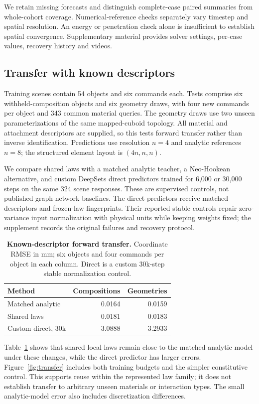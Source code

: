 \documentclass[10pt,twocolumn,letterpaper]{article}
\begin{document}
We retain missing forecasts and distinguish complete-case paired summaries from whole-cohort coverage. Numerical-reference checks separately vary timestep and spatial resolution. An energy or penetration check alone is insufficient to establish spatial convergence. Supplementary material provides solver settings, per-case values, recovery history and videos.

\subsection{Transfer with known descriptors}
Training scenes contain 54 objects and six commands each. Tests comprise six withheld-composition objects and six geometry draws, with four new commands per object and 343 common material queries. The geometry draws use two unseen parameterizations of the same mapped-cuboid topology. All material and attachment descriptors are supplied, so this tests forward transfer rather than inverse identification. Predictions use resolution $n=4$ and analytic references $n=8$; the structured element layout is $(4n,n,n)$.

We compare shared laws with a matched analytic teacher, a Neo-Hookean alternative, and custom DeepSets direct predictors trained for 6,000 or 30,000 steps on the same 324 scene responses. These are supervised controls, not published graph-network baselines. The direct predictors receive matched descriptors and frozen-law fingerprints. Their reported stable controls repair zero-variance input normalization with physical units while keeping weights fixed; the supplement records the original failures and recovery protocol.

\begin{table}[t]
\centering\small
\caption{\textbf{Known-descriptor forward transfer.} Coordinate RMSE in mm; six objects and four commands per object in each column. Direct is a custom 30k-step stable normalization control.}
\label{tab:transfer}
\begin{tabular}{lrr}\toprule
Method & Compositions & Geometries\\\midrule
Matched analytic & 0.0164 & 0.0159\\
Shared laws & 0.0181 & 0.0183\\
Custom direct, 30k & 3.0888 & 3.2933\\\bottomrule
\end{tabular}
\end{table}

Table~\ref{tab:transfer} shows that shared local laws remain close to the matched analytic model under these changes, while the direct predictor has larger errors. Figure~\ref{fig:transfer} includes both training budgets and the simpler constitutive control. This supports reuse within the represented law family; it does not establish transfer to arbitrary unseen materials or interaction types. The small analytic-model error also includes discretization differences.
\end{document}
